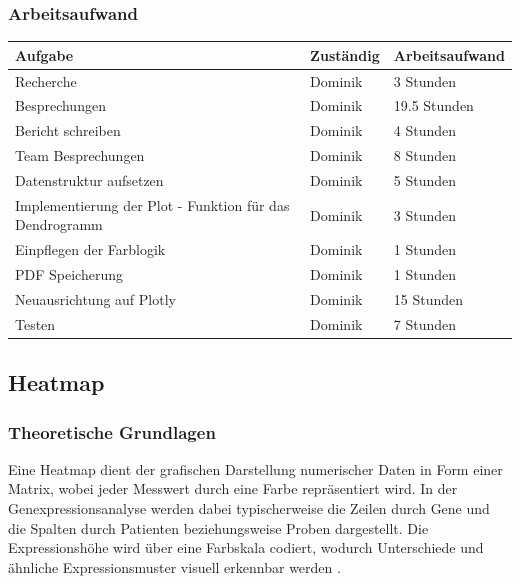 \documentclass[12pt]{article}
\begin{document}
\subsubsection{Arbeitsaufwand}
\begin{table}[h]
	\begin{tabular}{l|l|l}
		Aufgabe                       & Zuständig & Arbeitsaufwand \\ 
		\hline
		Recherche                     & Dominik    & 3 Stunden       \\
		Besprechungen                 & Dominik    & 19.5 Stunden    \\
		Bericht schreiben             & Dominik    & 4 Stunden  		\\
		Team Besprechungen            & Dominik    & 8 Stunden 		\\
		Datenstruktur aufsetzen           & Dominik    & 5 Stunden       \\
		Implementierung der Plot - Funktion für das Dendrogramm     	  & Dominik    & 3 Stunden       \\ 
		Einpflegen der Farblogik       & Dominik    & 1 Stunden       \\
		PDF Speicherung               & Dominik    & 1 Stunden       \\
		Neuausrichtung auf Plotly          & Dominik    & 15 Stunden       \\ 
		Testen                        & Dominik    & 7 Stunden      \\ 
		
	\end{tabular}
\end{table}




\newpage
\pagestyle{fancy}
\fancyhead{}

\subsection{Heatmap}
\label{heatmap}

\subsubsection{Theoretische Grundlagen}

Eine Heatmap dient der grafischen Darstellung numerischer Daten in Form einer Matrix, wobei jeder Messwert durch eine Farbe repräsentiert wird. In der Genexpressionsanalyse werden dabei typischerweise die Zeilen durch Gene und die Spalten durch Patienten beziehungsweise Proben dargestellt. Die Expressionshöhe wird über eine Farbskala codiert, wodurch Unterschiede und ähnliche Expressionsmuster visuell erkennbar werden \cite{Gu2016}.
\end{document}
